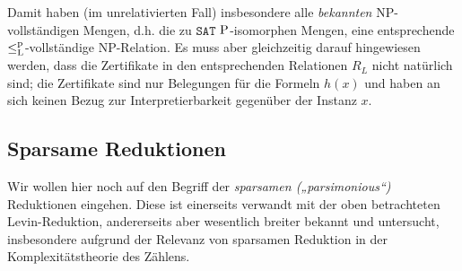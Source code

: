 Damit haben (im unrelativierten Fall) insbesondere alle \emph{bekannten} NP-vollständigen Mengen, d.h. die zu $\mathtt{SAT}$ $\P$-isomorphen Mengen, eine entsprechende $\leqlp$-vollständige NP-Relation.
Es muss aber gleichzeitig darauf hingewiesen werden, dass die Zertifikate in den entsprechenden Relationen $R_L$ nicht natürlich sind; die Zertifikate sind nur Belegungen für die Formeln $h(x)$ und haben an sich keinen Bezug zur Interpretierbarkeit gegenüber der Instanz $x$.

%

\subsection*{Sparsame Reduktionen}

Wir wollen hier noch auf den Begriff der \emph{sparsamen („parsimonious“)} Reduktionen eingehen. Diese ist einerseits verwandt mit der oben betrachteten Levin-Reduktion, andererseits aber wesentlich breiter bekannt und untersucht, insbesondere aufgrund der Relevanz von sparsamen Reduktion in der Komplexitätstheorie des Zählens.


